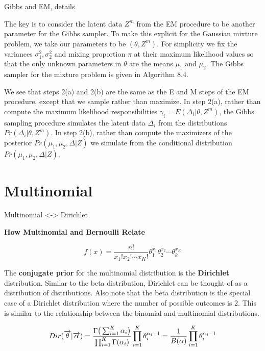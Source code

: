 \documentclass[
  ignorenonframetext,
]{beamer}
\begin{document}
\begin{frame}{Gibbs and EM, details}
\protect\hypertarget{gibbs-and-em-details}{}

\footnotesize

The key is to consider the latent data \(Z^m\) from the EM procedure to
be another parameter for the Gibbs sampler. To make this explicit for
the Gaussian mixture problem, we take our parameters to be
\((\theta, Z^m)\). For simplicity we fix the variances
\(\sigma_1^2,\sigma_2^2\) and mixing proportion \(\pi\) at their maximum
likelihood values so that the only unknown parameters in \(\theta\) are
the means \(\mu_1\) and \(\mu_2\). The Gibbs sampler for the mixture
problem is given in Algorithm 8.4.

We see that steps 2(a) and 2(b) are the same as the E and M steps of the
EM procedure, except that we sample rather than maximize. In step 2(a),
rather than compute the maximum likelihood responsibilities
\(\gamma_i = E(\Delta_i | \theta, Z^m)\), the Gibbs sampling procedure
simulates the latent data \(\Delta_i\) from the distributions
\(Pr(\Delta_i | \theta, Z^m)\). In step 2(b), rather than compute the
maximizers of the posterior \(Pr(\mu_1, \mu_2, \Delta |Z )\) we simulate
from the conditional distribution \(Pr(\mu_1, \mu_2, \Delta |Z )\).

\end{frame}

\hypertarget{multinomial}{%
\section{Multinomial}\label{multinomial}}

\begin{frame}{Multinomial \textless{}-\textgreater{} Dirichlet}
\protect\hypertarget{multinomial---dirichlet}{}

\footnotesize

\textbf{How Multinomial and Bernoulli Relate}

\begin{equation}
f(x)=\dfrac{n!}{x_1!x_2!\cdots x_K!}\theta_1^{x_1} \theta_2^{x_2} \cdots \theta_k^{x_K}
\end{equation}

The \textbf{conjugate prior} for the multinomial distribution is the
\textbf{Dirichlet} distribution. Similar to the beta distribution,
Dirichlet can be thought of as a distribution of distributions. Also
note that the beta distribution is the special case of a Dirichlet
distribution where the number of possible outcomes is 2. This is similar
to the relationship between the binomial and multinomial distributions.

\begin{equation}
Dir(\overrightarrow{\theta}|\overrightarrow{\alpha})=
{ 
  {\Gamma {\bigl (}\sum _{i=1}^{K}\alpha _{i}{\bigr )}}
  \over{\prod _{i=1}^{K}\Gamma (\alpha _{i})}
}
\prod _{i=1}^{K}\theta_{i}^{\alpha _{i}-1} =
{ 
  1 \over B(\alpha)
}
\prod _{i=1}^{K}\theta_{i}^{\alpha _{i}-1} 
\end{equation}

\end{frame}
\end{document}
